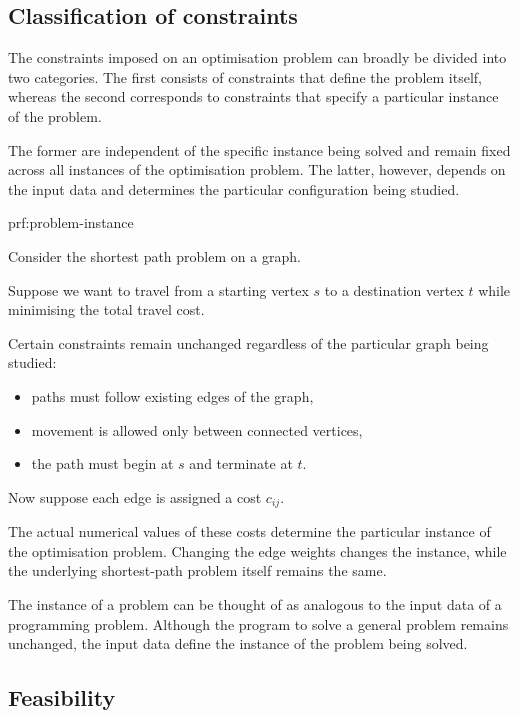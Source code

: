 \subsection{Classification of constraints}

The constraints imposed on an optimisation problem can broadly be divided into two categories. The first consists of constraints that define the problem itself, whereas the second corresponds to constraints that specify a particular instance of the problem.

The former are independent of the specific instance being solved and remain fixed across all instances of the optimisation problem. The latter, however, depends on the input data and determines the particular configuration being studied.

\begin{prf}{prf:problem-instance}

    Consider the shortest path problem on a graph.

    Suppose we want to travel from a starting vertex \(s\) to a destination vertex \(t\) while minimising the total travel cost.

    Certain constraints remain unchanged regardless of the particular graph being studied:
    \begin{itemize}
        \item paths must follow existing edges of the graph,
        \item movement is allowed only between connected vertices,
        \item the path must begin at \(s\) and terminate at \(t\).
    \end{itemize}

    Now suppose each edge is assigned a cost $c_{ij}$.

    The actual numerical values of these costs determine the particular instance of the optimisation problem. Changing the edge weights changes the instance, while the underlying shortest-path problem itself remains the same.
\end{prf}

The instance of a problem can be thought of as analogous to the input data of a programming problem. Although the program to solve a general problem remains unchanged, the input data define the instance of the problem being solved.

\subsection{Feasibility}

